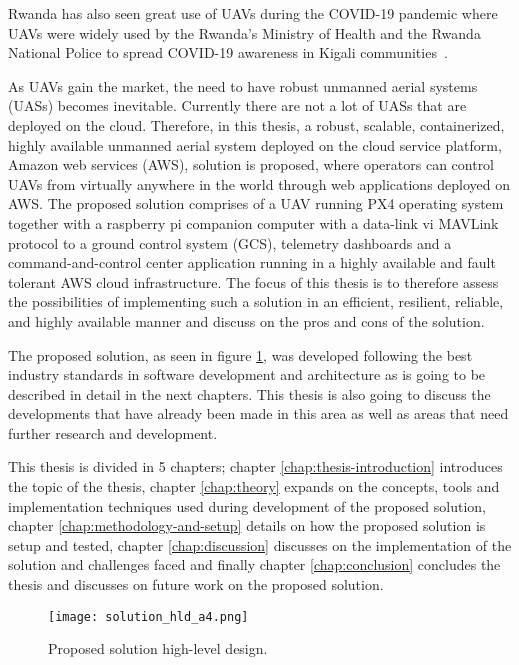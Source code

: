 Rwanda has also seen great use of UAVs during the COVID-19 pandemic where UAVs were widely used by the Rwanda’s Ministry of Health and the Rwanda National Police to spread COVID-19 awareness in Kigali communities~\cite{whoafricarw2020}.

As UAVs gain the market, the need to have robust unmanned aerial systems (UASs) becomes inevitable. Currently there are not a lot of UASs that are deployed on the cloud. Therefore, in this thesis, a robust, scalable, containerized, highly available unmanned aerial system deployed on the cloud service platform, Amazon web services (AWS), solution is proposed, where operators can control UAVs from virtually anywhere in the world through web applications deployed on AWS. The proposed solution comprises of a UAV running PX4 operating system together with a raspberry pi companion computer with a data-link vi MAVLink protocol to a ground control system (GCS), telemetry dashboards and a command-and-control center application running in a highly available and fault tolerant AWS cloud infrastructure. The focus of this thesis is to therefore assess the possibilities of implementing such a solution in an efficient, resilient, reliable, and highly available manner and discuss on the pros and cons of the solution.

The proposed solution, as seen in figure \ref{fig:solution-hld-a4}, was developed following the best industry standards in software development and architecture as is going to be described in detail in the next chapters. This thesis is also going to discuss the developments that have already been made in this area as well as areas that need further research and development.

This thesis is divided in 5 chapters; chapter \ref{chap:thesis-introduction} introduces the topic of the thesis, chapter \ref{chap:theory} expands on the concepts, tools and implementation techniques used during development of the proposed solution, chapter \ref{chap:methodology-and-setup} details on how the proposed solution is setup and tested, chapter \ref{chap:discussion} discusses on the implementation of the solution and challenges faced and finally chapter \ref{chap:conclusion} concludes the thesis and discusses on future work on the proposed solution.

\begin{figure}[!htbp]
    \centering \texttt{[image: solution\_hld\_a4.png]}
    \caption{Proposed solution high-level design.}
    \label{fig:solution-hld-a4}
\end{figure}


